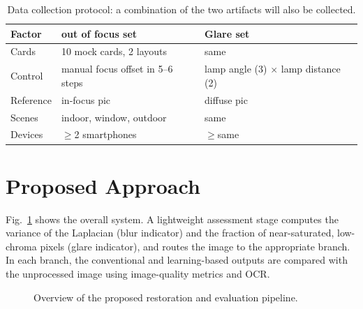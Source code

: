 \documentclass{article}
\begin{document}
\begin{table}[t]
\centering
\small
\caption{Data collection protocol: a combination of the two artifacts will also be collected.}
\label{tab:protocol}
\begin{tabular}{p{0.5in}p{1.2in}p{1.2in}}
\hline
Factor & out of focus set & Glare set \\ %
\hline
Cards & 10 mock cards, 2 layouts & same \\
Control & manual focus offset in 5--6 steps & lamp angle (3) $\times$ lamp distance (2) \\
Reference & in-focus pic & diffuse pic \\
Scenes & indoor, window, outdoor & same \\
Devices & $\geq$2 smartphones & $\geq$same \\
\hline
\end{tabular}
\end{table}

\section{Proposed Approach}
\label{sec:typestyle}
Fig.~\ref{fig:pipeline} shows the overall system. A lightweight assessment stage computes the variance of the Laplacian (blur indicator) and the fraction of near-saturated, low-chroma pixels (glare indicator), and routes the image to the appropriate branch. In each branch, the conventional and learning-based outputs are compared with the unprocessed image using image-quality metrics and OCR.

\begin{figure}[t]
\centering
{}
\caption{Overview of the proposed restoration and evaluation pipeline.}
\label{fig:pipeline}
\end{figure}
\end{document}
